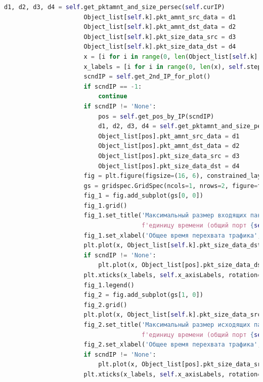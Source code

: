 \documentclass[bachelor, och, coursework]{SCWorks}
\begin{document}
\begin{lstlisting}[language=Python]
                      d1, d2, d3, d4 = self.get_pktamnt_and_size_persec(self.curIP)
                      Object_list[self.k].pkt_amnt_src_data = d1
                      Object_list[self.k].pkt_amnt_dst_data = d2
                      Object_list[self.k].pkt_size_data_src = d3
                      Object_list[self.k].pkt_size_data_dst = d4
                      x = [i for i in range(0, len(Object_list[self.k].pkt_size_data_src))]
                      x_labels = [i for i in range(0, len(x), self.step)]
                      scndIP = self.get_2nd_IP_for_plot()
                      if scndIP == -1:
                          continue
                      if scndIP != 'None':
                          pos = self.get_pos_by_IP(scndIP)
                          d1, d2, d3, d4 = self.get_pktamnt_and_size_persec(scndIP)
                          Object_list[pos].pkt_amnt_src_data = d1
                          Object_list[pos].pkt_amnt_dst_data = d2
                          Object_list[pos].pkt_size_data_src = d3
                          Object_list[pos].pkt_size_data_dst = d4
                      fig = plt.figure(figsize=(16, 6), constrained_layout=True)
                      gs = gridspec.GridSpec(ncols=1, nrows=2, figure=fig)
                      fig_1 = fig.add_subplot(gs[0, 0])
                      fig_1.grid()
                      fig_1.set_title('Максимальный размер входящих пакетов, полученных за ' + \
                                      f'единицу времени (общий порт {self.curPort})', fontsize=15 )
                      fig_1.set_xlabel('Общее время перехвата трафика', fontsize=15)
                      plt.plot(x, Object_list[self.k].pkt_size_data_dst, 'b', label=self.curIP)
                      if scndIP != 'None':
                          plt.plot(x, Object_list[pos].pkt_size_data_dst, 'r', label=scndIP)
                      plt.xticks(x_labels, self.x_axisLabels, rotation=30, fontsize=8)
                      fig_1.legend()
                      fig_2 = fig.add_subplot(gs[1, 0])
                      fig_2.grid()
                      plt.plot(x, Object_list[self.k].pkt_size_data_src, 'orange', label=self.curIP)
                      fig_2.set_title('Максимальный размер исходящих пакетов, полученных за ' + \
                                      f'единицу времени (общий порт {self.curPort})', fontsize=15 )
                      fig_2.set_xlabel('Общее время перехвата трафика', fontsize=15)
                      if scndIP != 'None':
                          plt.plot(x, Object_list[pos].pkt_size_data_src, 'g', label=scndIP)
                      plt.xticks(x_labels, self.x_axisLabels, rotation=30, fontsize=8)

\end{lstlisting}
\end{document}
